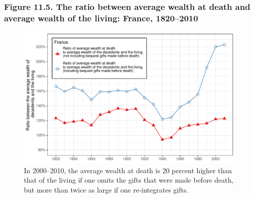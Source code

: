 \documentclass[t]{beamer}\usepackage[]{graphicx}\usepackage[]{color}
\newenvironment{knitrout}{}{} %
\begin{document}
\begin{frame}[label=Figure_11_5]
\frametitle{Figure 11.5. The ratio between average wealth at death and average wealth of the living: France, 1820--2010}
\begin{figure}[t]
\begin{minipage}[b]{\textwidth}
\centering
\begin{knitrout}\footnotesize
{}\color{fgcolor}

{\centering \includegraphics[width=1\linewidth]{figures/color/Figure_11_5} 

}



\end{knitrout}
\caption{In 2000--2010, the average wealth at death is 20 percent higher than that of the living if one omits the gifts that were made before death, but more than twice as large if one re-integrates gifts.}
\end{minipage}
\end{figure}
\end{frame}
\end{document}
